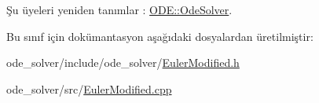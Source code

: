 Şu üyeleri yeniden tanımlar \+: \mbox{\hyperlink{classODE_1_1OdeSolver_a000187013258d0b43ffd8a14486e7ab8}{O\+D\+E\+::\+Ode\+Solver}}.



Bu sınıf için dokümantasyon aşağıdaki dosyalardan üretilmiştir\+:\begin{DoxyCompactItemize}
\item 
ode\+\_\+solver/include/ode\+\_\+solver/\mbox{\hyperlink{EulerModified_8h}{Euler\+Modified.\+h}}\item 
ode\+\_\+solver/src/\mbox{\hyperlink{EulerModified_8cpp}{Euler\+Modified.\+cpp}}\end{DoxyCompactItemize}
